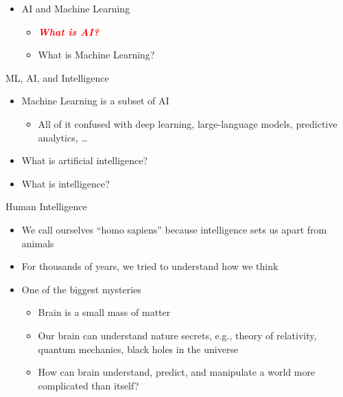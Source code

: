 \documentclass[
  10pt,
  ignorenonframetext,
]{beamer}
\providecommand{\tightlist}{%
  \setlength{\itemsep}{0pt}\setlength{\parskip}{0pt}}
\begin{document}
\begin{frame}{}
\label{section-1}
\begin{itemize}
\tightlist
\item
  AI and Machine Learning

  \begin{itemize}
  \tightlist
  \item
    \emph{\textbf{\textcolor{red}{What is AI?}}}
  \item
    What is Machine Learning?
  \end{itemize}
\end{itemize}
\end{frame}

\begin{frame}{ML, AI, and Intelligence}
\label{ml-ai-and-intelligence}
\begin{itemize}
\tightlist
\item
  Machine Learning is a subset of AI

  \begin{itemize}
  \tightlist
  \item
    All of it confused with deep learning, large-language models,
    predictive analytics, \ldots{}
  \end{itemize}
\item
  What is artificial intelligence?
\item
  What is intelligence?
\end{itemize}
\end{frame}

\begin{frame}{Human Intelligence}
\label{human-intelligence}
\begin{itemize}
\item
  We call ourselves ``homo sapiens'' because intelligence sets us apart
  from animals
\item
  For thousands of years, we tried to understand how we think
\item
  One of the biggest mysteries

  \begin{itemize}
  \tightlist
  \item
    Brain is a small mass of matter
  \item
    Our brain can understand nature secrets, e.g., theory of relativity,
    quantum mechanics, black holes in the universe
  \item
    How can brain understand, predict, and manipulate a world more
    complicated than itself?
  \end{itemize}
\end{itemize}
\end{frame}
\end{document}
